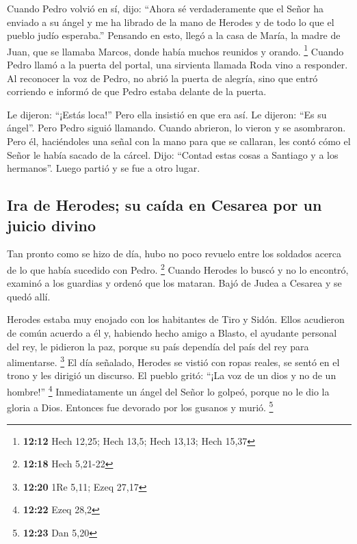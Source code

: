  Cuando Pedro volvió en sí, dijo: ``Ahora sé
verdaderamente que el Señor ha enviado a su ángel y me ha librado de la
mano de Herodes y de todo lo que el pueblo judío esperaba.''
 Pensando en esto, llegó a la casa de María, la madre de
Juan, que se llamaba Marcos, donde había muchos reunidos y orando.
\footnote{\textbf{12:12} Hech 12,25; Hech 13,5; Hech 13,13; Hech 15,37}
 Cuando Pedro llamó a la puerta del portal, una sirvienta
llamada Roda vino a responder.  Al reconocer la voz de
Pedro, no abrió la puerta de alegría, sino que entró corriendo e informó
de que Pedro estaba delante de la puerta.

 Le dijeron: ``¡Estás loca!'' Pero ella insistió en que
era así. Le dijeron: ``Es su ángel''.  Pero Pedro siguió
llamando. Cuando abrieron, lo vieron y se asombraron. 
Pero él, haciéndoles una señal con la mano para que se callaran, les
contó cómo el Señor le había sacado de la cárcel. Dijo: ``Contad estas
cosas a Santiago y a los hermanos''. Luego partió y se fue a otro lugar.

\hypertarget{ira-de-herodes-su-cauxedda-en-cesarea-por-un-juicio-divino}{%
\subsection{Ira de Herodes; su caída en Cesarea por un juicio
divino}\label{ira-de-herodes-su-cauxedda-en-cesarea-por-un-juicio-divino}}

 Tan pronto como se hizo de día, hubo no poco revuelo
entre los soldados acerca de lo que había sucedido con Pedro.
\footnote{\textbf{12:18} Hech 5,21-22}  Cuando Herodes lo
buscó y no lo encontró, examinó a los guardias y ordenó que los mataran.
Bajó de Judea a Cesarea y se quedó allí.

 Herodes estaba muy enojado con los habitantes de Tiro y
Sidón. Ellos acudieron de común acuerdo a él y, habiendo hecho amigo a
Blasto, el ayudante personal del rey, le pidieron la paz, porque su país
dependía del país del rey para alimentarse. \footnote{\textbf{12:20} 1Re
  5,11; Ezeq 27,17}  El día señalado, Herodes se vistió
con ropas reales, se sentó en el trono y les dirigió un discurso.
 El pueblo gritó: ``¡La voz de un dios y no de un
hombre!'' \footnote{\textbf{12:22} Ezeq 28,2} 
Inmediatamente un ángel del Señor lo golpeó, porque no le dio la gloria
a Dios. Entonces fue devorado por los gusanos y murió. \footnote{\textbf{12:23}
  Dan 5,20}

